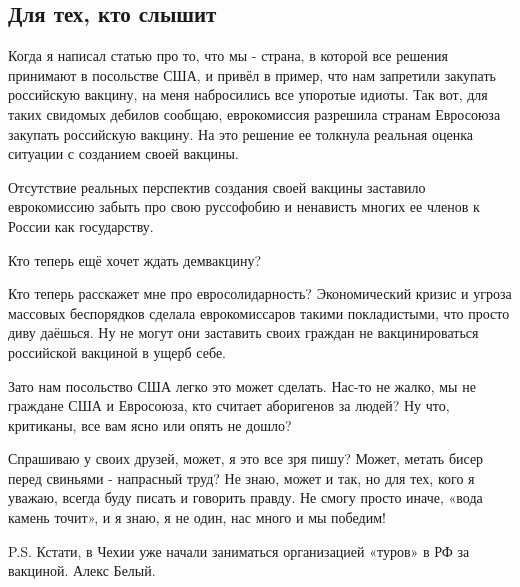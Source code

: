  
 
 

\subsection{Для тех, кто слышит}
\label{sec:06_11_2020.fb.alex_belyy.1.kovid_vaccine}

Когда я написал статью про то, что мы - страна, в которой все решения принимают
в посольстве США, и привёл в пример, что нам запретили закупать российскую
вакцину, на меня набросились все упоротые идиоты. Так вот, для таких свидомых
дебилов сообщаю, еврокомиссия разрешила странам Евросоюза  закупать российскую
вакцину. На это решение ее толкнула реальная оценка ситуации с созданием своей
вакцины. 

Отсутствие реальных перспектив создания своей вакцины заставило еврокомиссию
забыть про свою руссофобию и ненависть многих ее членов к России как
государству. 

Кто теперь ещё хочет ждать демвакцину? 

Кто теперь расскажет мне про  евросолидарность? Экономический кризис и угроза
массовых беспорядков сделала еврокомиссаров такими покладистыми, что просто
диву даёшься. Ну не могут они заставить своих граждан не вакцинироваться
российской вакциной в ущерб себе. 

Зато нам посольство США легко это может сделать. Нас-то не жалко, мы не
граждане США  и Евросоюза, кто считает аборигенов за людей? Ну что, критиканы,
все вам ясно или опять не дошло? 

Спрашиваю у своих друзей, может, я это все зря пишу? Может, метать бисер перед
свиньями - напрасный труд? Не знаю, может и так, но для тех, кого я уважаю,
всегда буду писать и говорить правду. Не смогу просто иначе, «вода камень
точит», и я знаю, я не один, нас много и мы победим!

P.S. Кстати, в Чехии уже начали заниматься организацией «туров» в РФ за
вакциной.  Алекс Белый.
